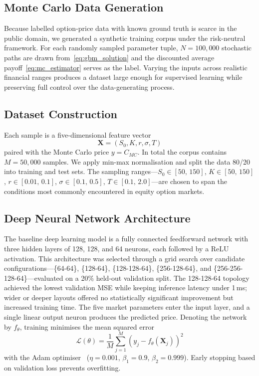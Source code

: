\documentclass[conference]{IEEEtran}
\begin{document}
\subsection{Monte Carlo Data Generation}

Because labelled option-price data with known ground truth is scarce in the public domain, we generated a synthetic training corpus under the risk-neutral framework. For each randomly sampled parameter tuple, $N = 100{,}000$ stochastic paths are drawn from~\eqref{eq:gbm_solution} and the discounted average payoff~\eqref{eq:mc_estimator} serves as the label. Varying the inputs across realistic financial ranges produces a dataset large enough for supervised learning while preserving full control over the data-generating process.

\subsection{Dataset Construction}

Each sample is a five-dimensional feature vector
\begin{equation}
    \mathbf{X} = (S_0, K, r, \sigma, T)
\end{equation}
paired with the Monte Carlo price $y = C_{MC}$. In total the corpus contains $M = 50{,}000$ samples. We apply min-max normalisation and split the data 80/20 into training and test sets. The sampling ranges---$S_0 \in [50,\,150]$, $K \in [50,\,150]$, $r \in [0.01,\,0.1]$, $\sigma \in [0.1,\,0.5]$, $T \in [0.1,\,2.0]$---are chosen to span the conditions most commonly encountered in equity option markets.

\subsection{Deep Neural Network Architecture}

The baseline deep learning model is a fully connected feedforward network with three hidden layers of 128, 128, and 64 neurons, each followed by a ReLU activation.  This architecture was selected through a grid search over candidate configurations---\{64-64\}, \{128-64\}, \{128-128-64\}, \{256-128-64\}, and \{256-256-128-64\}---evaluated on a 20\% held-out validation split. The 128-128-64 topology achieved the lowest validation MSE while keeping inference latency under 1\,ms; wider or deeper layouts offered no statistically significant improvement but increased training time. The five market parameters enter the input layer, and a single linear output neuron produces the predicted price.  Denoting the network by $f_\theta$, training minimises the mean squared error
\begin{equation}\label{eq:mse_loss}
    \mathcal{L}(\theta) = \frac{1}{M} \sum_{j=1}^{M} (y_j - f_\theta(\mathbf{X}_j))^2
\end{equation}
with the Adam optimiser~\cite{b23} ($\eta = 0.001$, $\beta_1 = 0.9$, $\beta_2 = 0.999$). Early stopping based on validation loss prevents overfitting.
\end{document}
